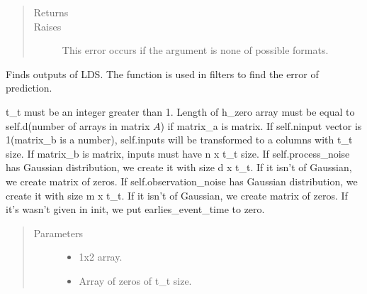 \documentclass[letterpaper,10pt,english]{sphinxmanual}
\begin{document}
\begin{fulllineitems}
\begin{fulllineitems}
\begin{quote}
\begin{description}
\item[{Returns}] \leavevmode
{}

\item[{Raises}] \leavevmode
\sphinxAtStartPar
{} \textendash{} This error occurs if the argument is none of possible formats.

\end{description}\end{quote}

\end{fulllineitems}


\begin{fulllineitems}
\label{\detokenize{LDS.LDS.ds:LDS.LDS.ds.dynamical_system.DynamicalSystem.solve}}
\sphinxAtStartPar
Finds outputs of LDS. The function is used in filters to find the error of prediction.

\sphinxAtStartPar
t\_t must be an integer greater than 1.
Length of h\_zero array must be equal to
self.d(number of arrays in matrix \(A\)) if matrix\_a
is matrix.
If self.n\sphinxhyphen{}input vector is 1(matrix\_b is a number),
self.inputs will be transformed to a columns with t\_t
size.
If matrix\_b is matrix, inputs must have n x t\_t size.
If self.process\_noise has Gaussian distribution, we
create it with size d x t\_t. If it isn’t of Gaussian,
we create matrix of zeros.
If self.observation\_noise has Gaussian distribution, we
create it with size m x t\_t. If it isn’t of Gaussian,
we create matrix of zeros.
If it’s wasn’t given in init, we put earlies\_event\_time
to zero.
\begin{quote}\begin{description}
\item[{Parameters}] \leavevmode\begin{itemize}
\item {} 
\sphinxAtStartPar
{} \textendash{} 1x2 array.

\item {} 
\sphinxAtStartPar
{} \textendash{} Array of zeros of t\_t size.


\end{itemize}
\end{description}
\end{quote}
\end{fulllineitems}
\end{fulllineitems}
\end{document}
